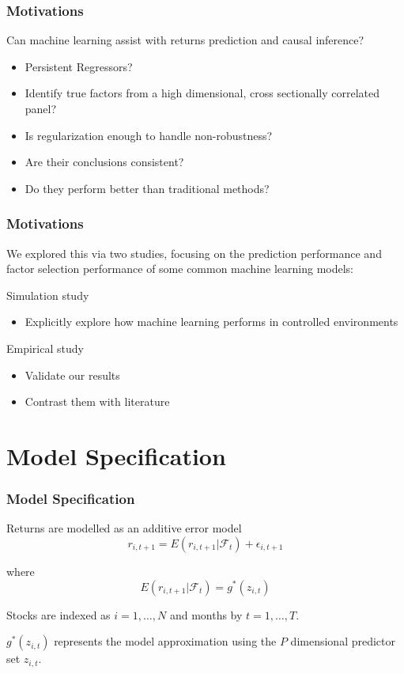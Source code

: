 \documentclass[aspectratio=169]{beamer}
\begin{document}
\begin{frame}
\frametitle{Motivations}
Can machine learning assist with returns prediction and causal inference?
\begin{itemize}
	\item Persistent Regressors?
	\item Identify true factors from a high dimensional, cross sectionally correlated panel?
	\item Is regularization enough to handle non-robustness?
	\item Are their conclusions consistent?
	\item Do they perform better than traditional methods?
\end{itemize}
\end{frame}

\begin{frame}
\frametitle{Motivations}
We explored this via two studies, focusing on the prediction performance and factor selection performance of some common machine learning models:

Simulation study
\begin{itemize}
	\item Explicitly explore how machine learning performs in controlled environments
\end{itemize}

Empirical study
\begin{itemize}
	\item Validate our results
	\item Contrast them with literature
\end{itemize}
\end{frame}

\section{Model Specification}

\begin{frame}
\frametitle{Model Specification}
Returns are modelled as an additive error model
\begin{equation}
	r_{i, t+1} = E(r_{i, t+1} | \mathcal{F}_t) + \epsilon_{i, t+1}
\end{equation}
		
where 
\begin{equation}
	E(r_{i, t+1} | \mathcal{F}_t) = g^*(z_{i,t})
\end{equation}
		
Stocks are indexed as $i = 1, \dots, N$ and months by $t = 1, \dots, T$. 

$g^*(z_{i,t})$ represents the model approximation using the $P$ dimensional predictor set $z_{i,t}$. 
\end{frame}
\end{document}
